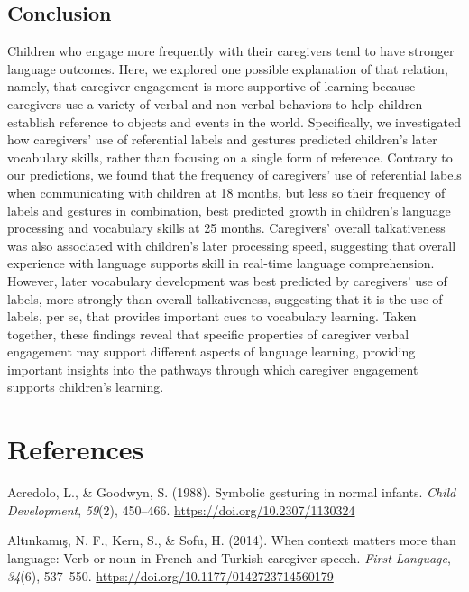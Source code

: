 \documentclass[
  english,
  man,floatsintext]{apa6}
\begin{document}
\hypertarget{conclusion}{%
\subsection{Conclusion}\label{conclusion}}

Children who engage more frequently with their caregivers tend to have stronger language outcomes. Here, we explored one possible explanation of that relation, namely, that caregiver engagement is more supportive of learning because caregivers use a variety of verbal and non-verbal behaviors to help children establish reference to objects and events in the world. Specifically, we investigated how caregivers' use of referential labels and gestures predicted children's later vocabulary skills, rather than focusing on a single form of reference. Contrary to our predictions, we found that the frequency of caregivers' use of referential labels when communicating with children at 18 months, but less so their frequency of labels and gestures in combination, best predicted growth in children's language processing and vocabulary skills at 25 months. Caregivers' overall talkativeness was also associated with children's later processing speed, suggesting that overall experience with language supports skill in real-time language comprehension. However, later vocabulary development was best predicted by caregivers' use of labels, more strongly than overall talkativeness, suggesting that it is the use of labels, per se, that provides important cues to vocabulary learning. Taken together, these findings reveal that specific properties of caregiver verbal engagement may support different aspects of language learning, providing important insights into the pathways through which caregiver engagement supports children's learning.

\newpage

\hypertarget{references}{%
\section{References}\label{references}}

\hypertarget{refs}{}
\leavevmode\hypertarget{ref-acredolo_symbolic_1988}{}%
Acredolo, L., \& Goodwyn, S. (1988). Symbolic gesturing in normal infants. \emph{Child Development}, \emph{59}(2), 450--466. \url{https://doi.org/10.2307/1130324}

\leavevmode\hypertarget{ref-altinkamis_when_2014}{}%
Altınkamış, N. F., Kern, S., \& Sofu, H. (2014). When context matters more than language: Verb or noun in French and Turkish caregiver speech. \emph{First Language}, \emph{34}(6), 537--550. \url{https://doi.org/10.1177/0142723714560179}
\end{document}
